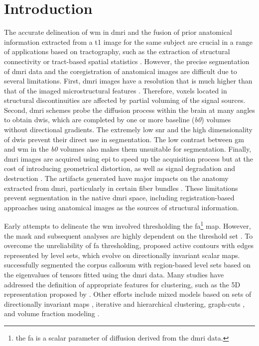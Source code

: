 \section{Introduction}\label{sec:introduction}
The accurate delineation of \gls*{wm} in \gls*{dmri} and the fusion of prior
  anatomical information extracted from a \gls*{t1} image for the same subject
  are crucial in a range of applications based on tractography, such as
  the extraction of structural connectivity \citep{craddock_imaging_2013} or
  tract-based spatial statistics \citep{smith_tractbased_2006}.
However, the precise segmentation of \gls*{dmri} data and the coregistration of anatomical
  images are difficult due to several limitations.
First, \gls{dmri} images have a resolution that is much higher than that of the imaged
  microstructural features \citep{basser_microstructural_1996}.
Therefore, voxels located in structural discontinuities are affected by partial
  voluming of the signal sources.
Second, \gls*{dmri} schemes probe the diffusion process within the brain at
  many angles to obtain \glspl*{dwi}, which are completed by one or more baseline (\emph{b0})
  volumes without directional gradients.
The extremely low \gls*{snr} and the high dimensionality of \glspl*{dwi} prevent their
  direct use in segmentation.
The low contrast between \gls*{gm} and \gls*{wm} in the \emph{b0} volumes also makes them unsuitable for
  segmentation.
Finally, \gls*{dmri} images are acquired using \gls*{epi} to speed up the acquisition process but
  at the cost of introducing geometrical distortion, as well as signal degradation and
  destruction \citep{jezzard_correction_1995}.
The artifacts generated have major impacts on the anatomy extracted
  from \gls*{dmri}, particularly in certain fiber bundles \citep{irfanoglu_effects_2012}.
These limitations prevent segmentation in the native \gls*{dmri} space, including
  registration-based approaches using anatomical images as the sources of structural
  information.


Early attempts to delineate the \gls*{wm} involved thresholding the
  \gls*{fa}\footnote{the \gls*{fa} is a scalar parameter of diffusion derived from
  the \gls*{dmri} data.} map.
However, the mask and subsequent analyses are highly dependent on the threshold set
  \citep{taoka_fractional_2009}.
To overcome the unreliability of \gls*{fa} thresholding,
  \cite{zhukov_level_2003} proposed active contours with edges represented
  by level sets, which evolve on directionally invariant scalar maps.
\cite{rousson_level_2004} successfully segmented the corpus callosum with
  region-based level sets based on the eigenvalues of tensors fitted using the
  \gls*{dmri} data.
Many studies have addressed the definition of appropriate features for clustering,
  such as the 5D representation proposed by \cite{jonasson_segmentation_2005}.
Other efforts include mixed models based on sets of directionally invariant maps
  \citep{liu_brain_2007}, iterative \citep{hadjiprocopis_unbiased_2005} and
  hierarchical \citep{lu_segmentation_2008} clustering,
  graph-cuts \citep{han_experimental_2009},
  and volume fraction modeling \citep{kumazawa_improvement_2013}.

